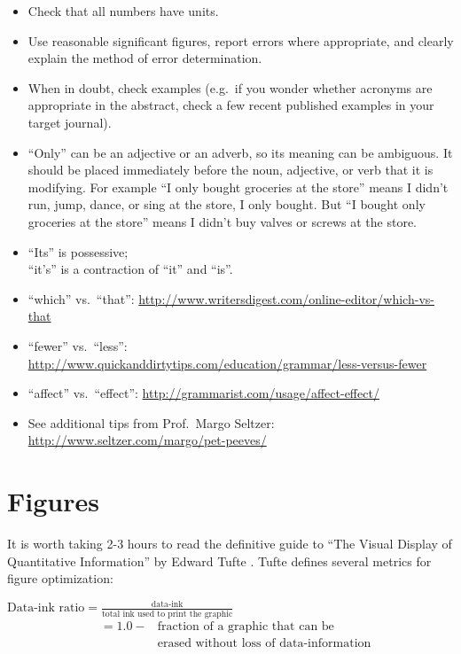 \begin{itemize}[label=$\Box$]
\item Check that all numbers have units.
\item Use reasonable significant figures, report errors where appropriate, and clearly explain the method of error determination.
\item When in doubt, check examples (e.g.\ if you wonder whether acronyms are appropriate in the abstract, check a few recent published examples in your target journal).
\item ``Only'' can be an adjective or an adverb, so its meaning can be ambiguous. It should be placed immediately before the noun, adjective, or verb that it is modifying. For example ``I only bought groceries at the store'' means I didn't run, jump, dance, or sing at the store, I only bought. But ``I bought only groceries at the store'' means I didn't buy valves or screws at the store.
\item ``Its'' is possessive;\\ ``it's'' is a contraction of ``it'' and ``is''.
\item ``which'' vs.\ ``that'': \url{http://www.writersdigest.com/online-editor/which-vs-that}
\item ``fewer'' vs.\ ``less'': \url{http://www.quickanddirtytips.com/education/grammar/less-versus-fewer}
\item ``affect'' vs.\ ``effect'': \url{http://grammarist.com/usage/affect-effect/}
\item See additional tips from Prof.\ Margo Seltzer: \url{http://www.seltzer.com/margo/pet-peeves/}
\end{itemize}

\section{\label{sec:Figures}Figures}

 It is worth taking 2-3 hours to read the definitive guide to ``The Visual Display of Quantitative Information'' by Edward Tufte \cite{TufteVisualDisplay2001}. Tufte defines several metrics for figure optimization:

\vspace{2mm}
\noindent $\displaystyle{\text{Data-ink ratio} = \frac{\text{data-ink}}{\text{total ink used to print the graphic}}}$
\vspace{-1mm}
\begin{eqnarray}
\nonumber & = 1.0 - & \text{fraction of a graphic that can be} \\[-2pt]
\nonumber & & \text{erased without loss of data-information}
\end{eqnarray}

